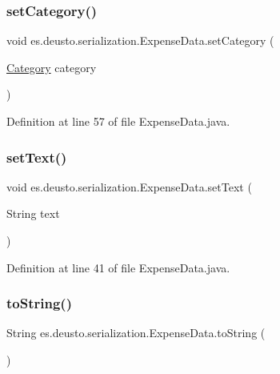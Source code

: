 \subsubsection{\texorpdfstring{set\+Category()}{setCategory()}}
{\footnotesize\ttfamily void es.\+deusto.\+serialization.\+Expense\+Data.\+set\+Category (\begin{DoxyParamCaption}\item[{\hyperlink{enumes_1_1deusto_1_1server_1_1jdo_1_1_category}{Category}}]{category }\end{DoxyParamCaption})}



Definition at line 57 of file Expense\+Data.\+java.

\mbox{\label{classes_1_1deusto_1_1serialization_1_1_expense_data_ae9cc50bc7eddb9ff751f5bb9a02eb0d4}} 
\subsubsection{\texorpdfstring{set\+Text()}{setText()}}
{\footnotesize\ttfamily void es.\+deusto.\+serialization.\+Expense\+Data.\+set\+Text (\begin{DoxyParamCaption}\item[{String}]{text }\end{DoxyParamCaption})}



Definition at line 41 of file Expense\+Data.\+java.

\mbox{\label{classes_1_1deusto_1_1serialization_1_1_expense_data_a89e0bc878ddf158ee69e56f26d0aa8e0}} 
\subsubsection{\texorpdfstring{to\+String()}{toString()}}
{\footnotesize\ttfamily String es.\+deusto.\+serialization.\+Expense\+Data.\+to\+String (\begin{DoxyParamCaption}{ }\end{DoxyParamCaption})}

